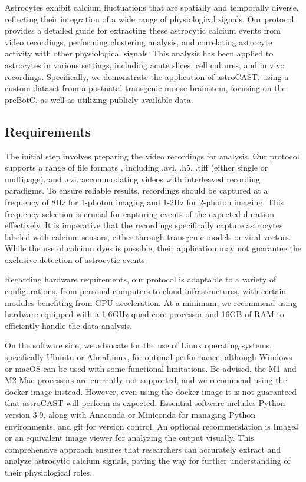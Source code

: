 
Astrocytes exhibit calcium fluctuations that are spatially and temporally diverse, reflecting their integration of a
wide range of physiological signals\citep{semyanov_making_2020,smedler_frequency_2014}. Our protocol provides a
detailed guide for extracting these astrocytic calcium events from video recordings, performing clustering analysis,
and correlating astrocyte activity with other physiological signals. This analysis has been applied to
astrocytes in various settings, including acute slices, cell cultures, and in vivo recordings. Specifically, we
demonstrate the application of astroCAST, using a custom dataset from a postnatal transgenic mouse brainstem,
focusing on the \ac{preBötC}, as well as utilizing publicly available data.

\subsection{Requirements}
The initial step involves preparing the video recordings for analysis. Our protocol supports a range of file formats
, including .avi, .h5, .tiff (either single or multipage), and .czi, accommodating videos with interleaved recording
paradigms. To ensure reliable results, recordings should be captured at a frequency of 8Hz for 1-photon imaging and
1-2Hz for 2-photon imaging. This frequency selection is crucial for capturing events of the expected duration
effectively. It is imperative that the recordings specifically capture astrocytes labeled with calcium sensors,
either through transgenic models or viral vectors. While the use of calcium dyes is possible, their application may
not guarantee the exclusive detection of astrocytic events.

Regarding hardware requirements, our protocol is adaptable to a variety of configurations, from personal computers to
cloud infrastructures, with certain modules benefiting from GPU acceleration. At a minimum, we recommend using
hardware equipped with a 1.6GHz quad-core processor and 16GB of RAM to efficiently handle the data analysis.

On the software side, we advocate for the use of Linux operating systems, specifically Ubuntu or AlmaLinux, for
optimal performance, although Windows or macOS can be used with some functional limitations. Be advised, the M1 and
M2 Mac processors are currently not supported, and we recommend using the docker image instead. However, even using
the docker image it is not guaranteed that astroCAST will perform as expected. Essential software
includes Python version 3.9, along with Anaconda or Miniconda for managing Python environments, and git for version
control. An optional recommendation is ImageJ or an equivalent image viewer for analyzing the output visually. This
comprehensive approach ensures that researchers can accurately extract and analyze astrocytic calcium signals, paving
the way for further understanding of their physiological roles.